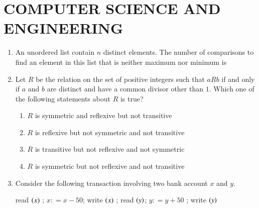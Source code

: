 \documentclass[journal,12pt,onecolumn]{IEEEtran}
\theoremstyle{remark}
\begin{document}
\section*{\Large COMPUTER SCIENCE AND ENGINEERING}
		\vspace{0.5cm}
	\vspace{0.5cm}
	\begin{enumerate}
		
		\item An unordered list contain $n$ distinct elements. The number of comparisons to find an element in this list that is neither maximum nor minimum is
		
		\hfill{}
		
		\begin{enumerate}
		\end{enumerate}
		
		\item Let $R$ be the relation on the set of positive integers such that $aRb$ if and only if $a$ and $b$ are distinct and have a common divisor other than $1$. Which one of the following statements about $R$ is true?
		
		\hfill{\brak{\text{GATE CS 2015}}}
		
		\begin{enumerate}
			\item $R$ is symmetric and reflexive but not transitive
			\item $R$ is reflexive but not symmetric and not transitive
			\item $R$ is transitive but not reflexive and not symmetric
			\item $R$ is symmetric but not reflexive and not transitive
		\end{enumerate}
		
		\item Consider the following transaction involving two bank account $x$ and $y$.
		
		read $\left(x\right)$ ; $x \colon= x - 50$; write $\left(x\right)$ ; read $\left(y\right)$; $y \colon= y + 50$ ; write $\left(y\right)$
		

\end{enumerate}
\end{document}
